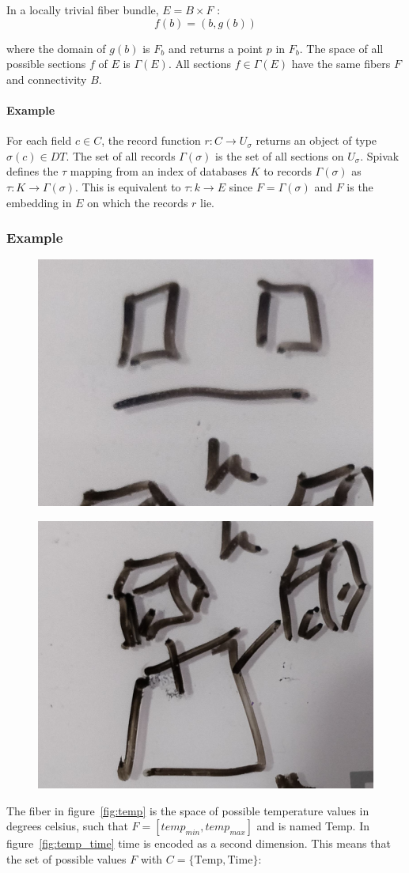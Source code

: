 \documentclass[../main.tex]{subfiles}
\begin{document}
In a locally trivial fiber bundle, $E = B \times F$ \cite{rowlandFiberBundle,FiberBundle2020}:
\begin{equation}
    \label{eq:section_return}
f(b) = (b, g(b))
\end{equation}

where the domain of $g(b)$ is $F_b$ and returns a point $p$ in $F_b$. The space of all possible sections $f$ of $E$ is $\Gamma(E)$. All sections $f \in \Gamma(E)$ have the same fibers $F$ and connectivity $B$. 
\paragraph{Example}

For each field $c \in C$, the record function $r: C \rightarrow U_{\sigma}$ returns an object of type $\sigma(c) \in DT$. The set of all records $\Gamma(\sigma)$ is the set of all sections on $U_\sigma$. Spivak defines the $\tau$ mapping from an index of databases $K$ to records $\Gamma(\sigma)$ as $\tau: K \rightarrow \Gamma(\sigma)$. This is equivalent to $\tau: k \rightarrow E$ since $F = \Gamma(\sigma)$ and $F$ is the embedding in $E$ on which the records $r$ lie.
 
\subsubsection{Example}
\begin{figure}[H]
    \includegraphics[width=0.2\linewidth]{figures/sections/math/temp_2f.png}
    \label{fig:}
\end{figure}
\begin{figure}[H]
    \includegraphics[width=0.2\linewidth]{figures/sections/math/temp_3f.png}
\end{figure}


The fiber in figure~\ref{fig:temp} is the space of possible temperature values in degrees celsius, such that $F=[temp_{min}, temp_{max}]$ and is named \textrm{Temp}. In figure~\ref{fig:temp_time} \textrm{time} is encoded as a second dimension. This means that the set of possible values $F$ with $C=\{\textrm{Temp}, \textrm{Time}\}$:
\end{document}
